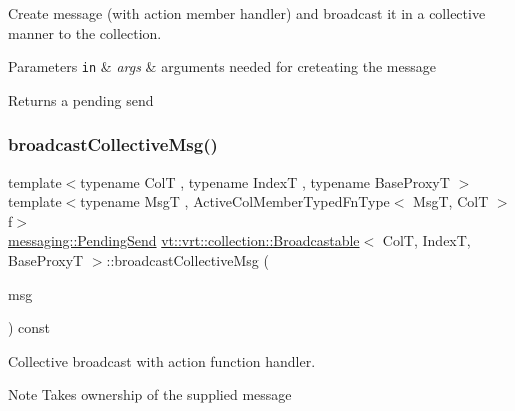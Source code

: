 Create message (with action member handler) and broadcast it in a collective manner to the collection. 


\begin{DoxyParams}[1]{Parameters}
\mbox{\tt in}  & {\em args} & arguments needed for creteating the message\\
\hline
\end{DoxyParams}
\begin{DoxyReturn}{Returns}
a pending send 
\end{DoxyReturn}
\mbox{\label{structvt_1_1vrt_1_1collection_1_1_broadcastable_a70ec0f06ef5566c713a4d960a8faa39b}} 
\subsubsection{\texorpdfstring{broadcast\+Collective\+Msg()}{broadcastCollectiveMsg()}\hspace{0.1cm}{\footnotesize\ttfamily [1/2]}}
{\footnotesize\ttfamily template$<$typename ColT , typename IndexT , typename Base\+ProxyT $>$ \\
template$<$typename MsgT , Active\+Col\+Member\+Typed\+Fn\+Type$<$ Msg\+T, Col\+T $>$ f$>$ \\
\hyperlink{structvt_1_1messaging_1_1_pending_send}{messaging\+::\+Pending\+Send} \hyperlink{structvt_1_1vrt_1_1collection_1_1_broadcastable}{vt\+::vrt\+::collection\+::\+Broadcastable}$<$ ColT, IndexT, Base\+ProxyT $>$\+::broadcast\+Collective\+Msg (\begin{DoxyParamCaption}\item[{\hyperlink{structvt_1_1messaging_1_1_msg_ptr_thief}{messaging\+::\+Msg\+Ptr\+Thief}$<$ MsgT $>$}]{msg }\end{DoxyParamCaption}) const}



Collective broadcast with action function handler. 

\begin{DoxyNote}{Note}
Takes ownership of the supplied message
\end{DoxyNote}

